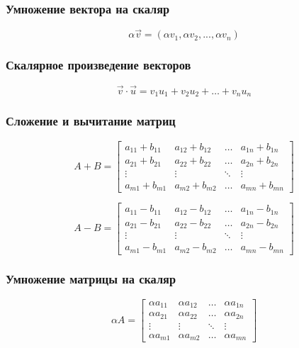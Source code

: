 \subsubsection{Умножение вектора на скаляр}

\[
\alpha \vec{v} = (\alpha v_1, \alpha v_2, ..., \alpha v_n)
\]

\subsubsection{Скалярное произведение векторов}

\[
\vec{v} \cdot \vec{u} = v_1u_1 + v_2u_2 + \dots + v_nu_n
\]

\subsubsection{Сложение и вычитание матриц}

\[
A + B = \begin{bmatrix}
a_{11} + b_{11} & a_{12} + b_{12} & \dots & a_{1n} + b_{1n} \\
a_{21} + b_{21} & a_{22} + b_{22} & \dots & a_{2n} + b_{2n} \\
\vdots & \vdots & \ddots & \vdots \\
a_{m1} + b_{m1} & a_{m2} + b_{m2} & \dots & a_{mn} + b_{mn}
\end{bmatrix}
\]

\[
A - B = \begin{bmatrix}
a_{11} - b_{11} & a_{12} - b_{12} & \dots & a_{1n} - b_{1n} \\
a_{21} - b_{21} & a_{22} - b_{22} & \dots & a_{2n} - b_{2n} \\
\vdots & \vdots & \ddots & \vdots \\
a_{m1} - b_{m1} & a_{m2} - b_{m2} & \dots & a_{mn} - b_{mn}
\end{bmatrix}
\]

\subsubsection{Умножение матрицы на скаляр}

\[
\alpha A = \begin{bmatrix}
\alpha a_{11} & \alpha a_{12} & \dots & \alpha a_{1n} \\
\alpha a_{21} & \alpha a_{22} & \dots & \alpha a_{2n} \\
\vdots & \vdots & \ddots & \vdots \\
\alpha a_{m1} & \alpha a_{m2} & \dots & \alpha a_{mn}
\end{bmatrix}
\]

